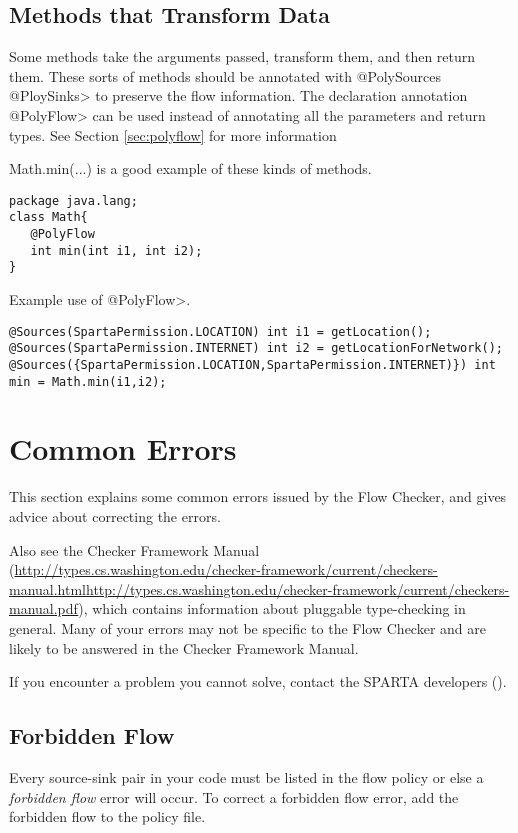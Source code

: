 \subsection{Methods that Transform Data}

Some methods take the arguments passed, transform them, and then return them.  These sorts of 
methods should be annotated with \<@PolySources @PloySinks>
  to preserve the flow information.  The declaration annotation \<@PolyFlow> can be used instead of
  annotating all the parameters and return types. See Section \ref{sec:polyflow} for more information 
  
  Math.min(...) is a good example of these kinds of methods. 
  
  \begin{Verbatim}
package java.lang;
class Math{
   @PolyFlow  
   int min(int i1, int i2);
}
\end{Verbatim}

Example use of \<@PolyFlow>.
\begin{Verbatim}
@Sources(SpartaPermission.LOCATION) int i1 = getLocation();
@Sources(SpartaPermission.INTERNET) int i2 = getLocationForNetwork();
@Sources({SpartaPermission.LOCATION,SpartaPermission.INTERNET)}) int min = Math.min(i1,i2);
 \end{Verbatim}

\section{Common Errors\label{errors}}

This section explains some common errors issued by the Flow Checker, and
gives advice about correcting the errors.   

Also see the Checker Framework Manual
(\ifhevea\url{http://types.cs.washington.edu/checker-framework/current/checkers-manual.html}\else\url{http://types.cs.washington.edu/checker-framework/current/checkers-manual.pdf}\fi),
which contains information about pluggable type-checking in general.  Many
of your errors may not be specific to the Flow Checker and are likely to be
answered in the Checker Framework Manual.

If you encounter a problem you cannot solve, contact the SPARTA developers ().



\subsection{Forbidden Flow}  
Every source-sink pair in your code must be listed in the flow policy or else a \emph{forbidden flow} error will occur.
To correct a forbidden flow error, add the forbidden flow to the policy file. 
  
